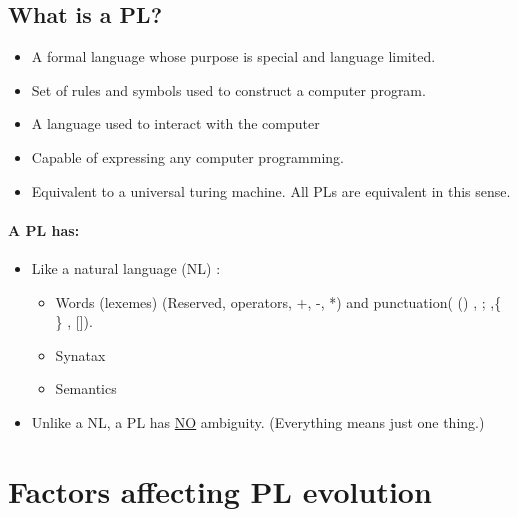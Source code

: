     \subsection{What is a PL?}
    \begin{itemize}
        \item A formal language whose purpose is special and language limited.
        \item Set of rules and symbols used to construct a computer program.
        \item A language used to interact with the computer
        \item Capable of expressing any computer programming.
        \item Equivalent to a universal turing machine. All PLs are equivalent in this sense.
    \end{itemize}
    \paragraph{A PL has:} 
    \begin{itemize}
        \item Like a natural language (NL) : \begin{itemize}
            \item Words (lexemes) (Reserved, operators, +, -, *) and punctuation( () , ; ,\{ \} , []).
            \item Synatax
            \item Semantics
        \end{itemize}
        \item Unlike a NL, a PL has \underline{NO} ambiguity. (Everything means just one thing.)
    \end{itemize}

    \section{Factors affecting PL evolution}

